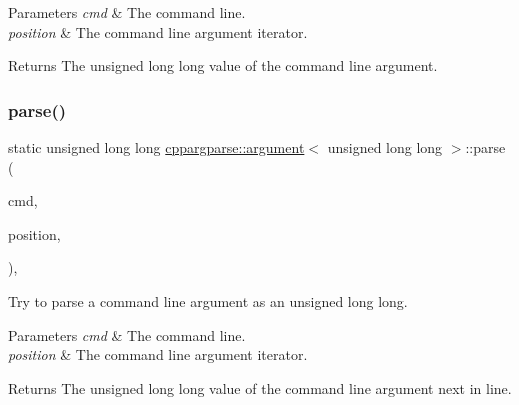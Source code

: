 \begin{DoxyParams}{Parameters}
{\em cmd} & The command line. \\
\hline
{\em position} & The command line argument iterator.\\
\hline
\end{DoxyParams}
\begin{DoxyReturn}{Returns}
The unsigned long long value of the command line argument. 
\end{DoxyReturn}
\mbox{\label{structcppargparse_1_1argument_3_01unsigned_01long_01long_01_4_afd2f459eea01e012b9bc0d5592fa0936}} 
\subsubsection{\texorpdfstring{parse()}{parse()}}
{\footnotesize\ttfamily static unsigned long long \hyperlink{structcppargparse_1_1argument}{cppargparse\+::argument}$<$ unsigned long long $>$\+::parse (\begin{DoxyParamCaption}\item[{const \hyperlink{types_8h_a80adf2418b7ce9fe616698efa7533ecf}{types\+::\+Command\+Line\+\_\+t} \&}]{cmd,  }\item[{const \hyperlink{types_8h_a43b4f43f8940de1bf09ced6f1b668053}{types\+::\+Command\+Line\+Position\+\_\+t} \&}]{position,  }\item[{const \hyperlink{types_8h_a003c660afe2ee9c6cc39aea966e8926d}{types\+::\+Command\+Line\+Arguments\+\_\+t} \&}]{ }\end{DoxyParamCaption})\hspace{0.3cm}{\ttfamily [inline]}, {\ttfamily [static]}}



Try to parse a command line argument as an unsigned long long. 


\begin{DoxyParams}{Parameters}
{\em cmd} & The command line. \\
\hline
{\em position} & The command line argument iterator.\\
\hline
\end{DoxyParams}
\begin{DoxyReturn}{Returns}
The unsigned long long value of the command line argument next in line. 
\end{DoxyReturn}
\mbox{\label{structcppargparse_1_1argument_3_01unsigned_01long_01long_01_4_a90e072df50bf4185486fe9c45d3e3ef0}} 
